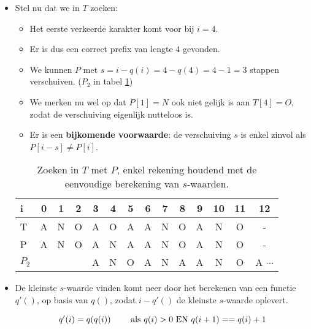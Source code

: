 \begin{itemize}
\begin{itemize}
            \item Stel nu dat we in $T$ zoeken:
            \begin{itemize}
                \item Het eerste verkeerde karakter komt voor bij $i = 4$. 
                \item Er is dus een correct prefix van lengte $4$ gevonden.
                \item We kunnen $P$ met $s = i - q(i) = 4 - q(4) = 4 - 1 = 3$ stappen verschuiven. ($P_2$ in tabel \ref{table:kmp2})
                \item We merken nu wel op dat $P[1] = N$ ook niet gelijk is aan $T[4] = O$, zodat de verschuiving eigenlijk nutteloos is.
                \item Er is een \textbf{bijkomende voorwaarde}: de verschuiving $s$ is enkel zinvol als \\ $P[i - s] \neq P[i]$.
            \end{itemize}
                        
            \begin{table}[ht]
                \centering
                \begin{tabular}{l | c c c c c c c c c c c c c}
                    i  & 0 & 1 & 2 & 3 & 4 & 5 & 6 & 7 & 8 & 9 & 10 & 11 & 12  \\
                    \hline
                    T    & A & N & O & A & O & A & A & N & O & A & N  & O  & - \\
                    P    & A & N & O & A & N & A & A & N & O & A & N  & O  & - \\
                    $P_2$    &   &   &   & A & N & O & A & N & A & A & N  & O  & A  $\cdots$\\
                \end{tabular}
                \caption{Zoeken in $T$ met $P$, enkel rekening houdend met de eenvoudige berekening van $s$-waarden.}
                \label{table:kmp2}
            \end{table}
           \item De kleinste $s$-waarde vinden komt neer door het berekenen van een functie $q'()$, op basis van $q()$, zodat $i - q'()$ de kleinste $s$-waarde oplevert.
            
           $$q'(i) = q(q(i)) \qquad \hbox{ als } q(i) > 0 \hbox{ EN } q(i + 1) == q(i) + 1$$
    \end{itemize}
\end{itemize}


